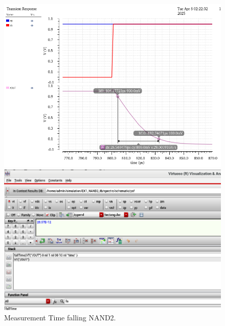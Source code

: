 \begin{figure}[H]
	\begin{minipage}{0.5\linewidth}
		\includegraphics[width=\linewidth]{section/EX1/NAND/EX1_NAND2_Tf_Waveform.png}
	\end{minipage}
	\begin{minipage}{0.5\linewidth}
		\includegraphics[width=\linewidth]{section/EX1/NAND/EX1_NAND2_Tf_Cal.png}
	\end{minipage}
	\caption{Measurement Time falling NAND2.}
\end{figure}

